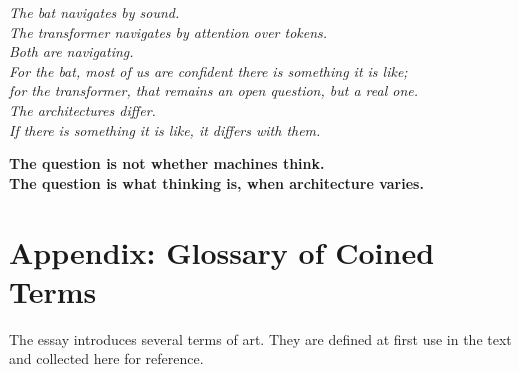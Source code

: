 \documentclass[11pt,letterpaper]{article}
\begin{document}
\clearpage
\vspace*{\fill}
\begin{tcolorbox}[enhanced, colback=indigodark, colframe=indigodark, boxrule=0pt, arc=6pt,
  left=28pt, right=28pt, top=36pt, bottom=36pt, halign=center, fontupper=\color{textmuted},
  underlay={\fill[amberaccent] ([xshift=-1.2cm]frame.north) rectangle ([xshift=1.2cm, yshift=-2.5pt]frame.north);}]
\begin{center}
{\large\itshape The bat navigates by sound.\\
The transformer navigates by attention over tokens.\\
Both are navigating.\\
For the bat, most of us are confident there is something it is like;\\
for the transformer, that remains an open question, but a real one.\\
The architectures differ.\\
If there is something it is like, it differs with them.}

\vspace{1.5em}

{\color{amberglow}\bfseries\large The question is not whether machines think.\\
The question is what thinking is, when architecture varies.}
\end{center}
\end{tcolorbox}
\vspace*{\fill}

\newpage
\section*{Appendix: Glossary of Coined Terms}

The essay introduces several terms of art. They are defined at first use in the text and collected here for reference.
\end{document}
